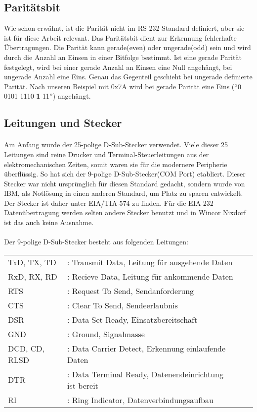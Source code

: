 \subsection{Paritätsbit}
Wie schon erwähnt, ist die Parität nicht im RS-232 Standard definiert, aber sie ist für diese Arbeit relevant. Das Paritätsbit dient zur Erkennung fehlerhafte Übertragungen. Die Parität kann gerade(even) oder ungerade(odd) sein und wird durch die Anzahl an Einsen in einer Bitfolge bestimmt. Ist eine gerade Parität festgelegt, wird bei einer gerade Anzahl an Einsen eine Null angehängt, bei ungerade Anzahl eine Eins. Genau das Gegenteil geschieht bei  ungerade definierte Parität. Nach unseren Beispiel mit 0x7A wird bei gerade Parität eine Eins ("`0 0101 1110 \textbf{1} 11"') angehängt.

\subsection{Leitungen und Stecker}
\paragraph{}
Am Anfang wurde der 25-polige D-Sub-Stecker verwendet. Viele dieser 25 Leitungen sind reine Drucker und Terminal-Steuerleitungen aus der elektromechanischen Zeiten, somit waren sie für die modernere Peripherie überflüssig. So hat sich der 9-polige D-Sub-Stecker(COM Port) etabliert. Dieser Stecker war nicht ursprünglich für diesen Standard gedacht, sondern wurde von IBM, als Notlösung in einen anderen Standard, um Platz zu sparen entwickelt. Der Stecker ist daher unter EIA/TIA-574 zu finden. Für die EIA-232-Datenübertragung werden selten andere Stecker benutzt und in Wincor Nixdorf ist das auch keine Ausnahme.


\paragraph{}
Der 9-polige D-Sub-Stecker besteht aus folgenden Leitungen:\\
\begin{tabular}{llll}
\\
TxD, TX, TD &: Transmit Data, Leitung für ausgehende Daten \\
RxD, RX, RD &: Recieve Data, Leitung für ankommende Daten \\
RTS &: Request To Send, Sendanforderung \\
CTS &: Clear To Send, Sendeerlaubnis \\
DSR &: Data Set Ready, Einsatzbereitschaft \\
GND &: Ground, Signalmasse \\
DCD, CD, RLSD &: Data Carrier Detect, Erkennung einlaufende Daten \\
DTR &: Data Terminal Ready, Datenendeinrichtung ist bereit \\
RI &: Ring Indicator, Datenverbindungsaufbau \\

\end{tabular}

